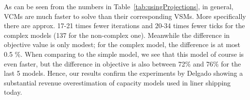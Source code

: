 \documentclass{llncs}
\begin{document}
As can be seen from the numbers in Table~\ref{tab:usingProjections}, in general, VCMs are much faster to solve than their corresponding VSMs. More specifically there are approx. 17-21 %
 times fewer iterations and 20-34 times fewer ticks for the complex models (137 for the non-complex one). %
Meanwhile the difference in objective value is only modest; for the complex model, the difference is at most 0.5 \%. %
When comparing to the simple model, we see that this model of course is even faster, %
but the difference in objective is also between 72\% and 76\% for the last 5 models. Hence, our results confirm the experiments by Delgado \cite{AlbertosThesis} showing a substantial revenue overestimation of capacity models used in liner shipping today. \\
\end{document}
